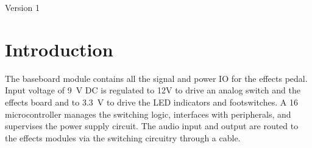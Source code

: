 \documentclass[12pt, titlepage]{/home/air/projects/latex-template/tex-template}
\begin{document}
\maketitle

\pagebreak
\tableofcontents
\pagebreak

\blankpage

\pagebreak
\begin{revisionhistory}
    Version 1
\end{revisionhistory}
\pagebreak

\blankpage

\pagebreak

\section{Introduction}
The baseboard module contains all the signal and power IO for the effects pedal. Input voltage of \SI{9}{\volt} DC is regulated to 12V to drive an analog switch and the effects board and to \SI{3.3}{\volt} to drive the LED indicators and footswitches. A \SI{16}{\bit} microcontroller manages the switching logic, interfaces with peripherals, and supervises the power supply circuit. The audio input and output are routed to the effects modules via the switching circuitry through a cable.
\end{document}
